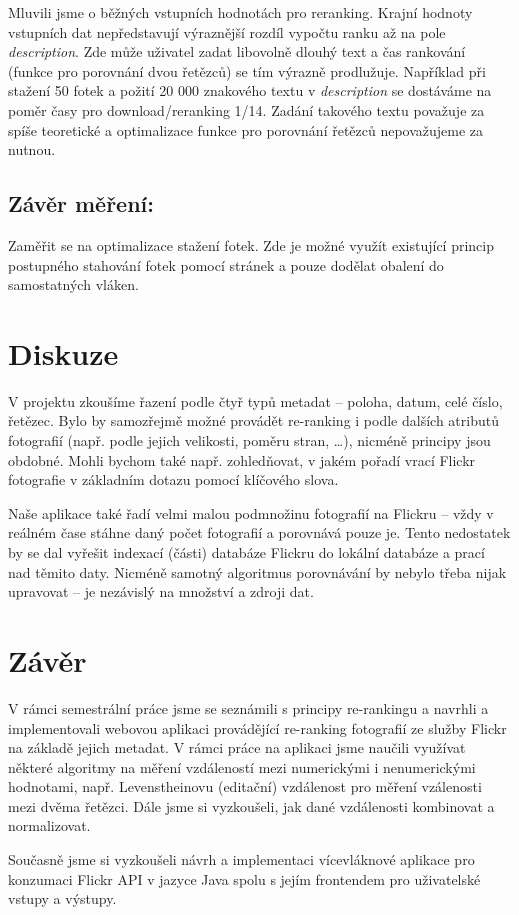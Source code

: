 \documentclass[12pt,oneside,a4paper]{article}
\begin{document}
Mluvili jsme o běžných vstupních hodnotách pro reranking. Krajní hodnoty vstupních dat nepředstavují výraznější rozdíl vypočtu ranku až na pole \textit{description}. Zde může uživatel zadat libovolně dlouhý text a čas rankování (funkce pro porovnání dvou řetězců) se tím výrazně prodlužuje. Například při stažení 50 fotek a požití 20 000 znakového textu v \textit{description} se dostáváme na poměr časy pro download/reranking 1/14. Zadání takového textu považuje za spíše teoretické a optimalizace funkce pro porovnání řetězců nepovažujeme za nutnou.

\subsection{Závěr měření:}
Zaměřit se na optimalizace stažení fotek. Zde je možné využít existující princip postupného stahování fotek pomocí stránek a pouze dodělat obalení do samostatných vláken.

\section{Diskuze}

V projektu zkoušíme řazení podle čtyř typů metadat -- poloha, datum, celé číslo, řetězec. Bylo by samozřejmě možné provádět re-ranking i podle dalších atributů fotografií (např. podle jejich velikosti, poměru stran, \ldots), nicméně principy jsou obdobné. Mohli bychom také např. zohledňovat, v jakém pořadí vrací Flickr fotografie v základním dotazu pomocí klíčového slova.

Naše aplikace také řadí velmi malou podmnožinu fotografií na Flickru -- vždy v reálném čase stáhne daný počet fotografií a porovnává pouze je. Tento nedostatek by se dal vyřešit indexací (části) databáze Flickru do lokální databáze a prací nad těmito daty. Nicméně samotný algoritmus porovnávání by nebylo třeba nijak upravovat -- je nezávislý na množství a zdroji dat.



\section{Závěr}
V rámci semestrální práce jsme se seznámili s principy re-rankingu a navrhli a implementovali webovou aplikaci provádějící re-ranking fotografií ze služby Flickr na základě jejich metadat. V rámci práce na aplikaci jsme naučili využívat některé algoritmy na měření vzdáleností mezi numerickými i nenumerickými hodnotami, např. Levenstheinovu (editační) vzdálenost pro měření vzálenosti mezi dvěma řetězci. Dále jsme si vyzkoušeli, jak dané vzdálenosti kombinovat a normalizovat.

Současně jsme si vyzkoušeli návrh a implementaci vícevláknové aplikace pro konzumaci Flickr API v jazyce Java spolu s jejím frontendem pro uživatelské vstupy a výstupy.  

\renewcommand{\refname}{Literatura}

{
 
}
\end{document}
